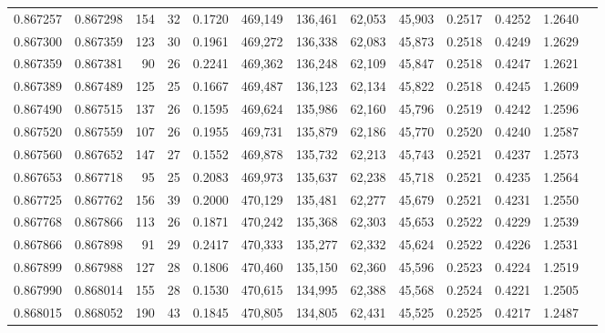 \begin{tabular}{rrrrrrrrrrrrr}
0.867257 & 0.867298 &   154 &  32 &                                     0.1720 & 469,149 & 136,461 &  62,053 &  45,903 & 0.2517 & 0.4252 & 1.2640 \\
0.867300 & 0.867359 &   123 &  30 &                                     0.1961 & 469,272 & 136,338 &  62,083 &  45,873 & 0.2518 & 0.4249 & 1.2629 \\
0.867359 & 0.867381 &    90 &  26 &                                     0.2241 & 469,362 & 136,248 &  62,109 &  45,847 & 0.2518 & 0.4247 & 1.2621 \\
0.867389 & 0.867489 &   125 &  25 &                                     0.1667 & 469,487 & 136,123 &  62,134 &  45,822 & 0.2518 & 0.4245 & 1.2609 \\
0.867490 & 0.867515 &   137 &  26 &                                     0.1595 & 469,624 & 135,986 &  62,160 &  45,796 & 0.2519 & 0.4242 & 1.2596 \\
0.867520 & 0.867559 &   107 &  26 &                                     0.1955 & 469,731 & 135,879 &  62,186 &  45,770 & 0.2520 & 0.4240 & 1.2587 \\
0.867560 & 0.867652 &   147 &  27 &                                     0.1552 & 469,878 & 135,732 &  62,213 &  45,743 & 0.2521 & 0.4237 & 1.2573 \\
0.867653 & 0.867718 &    95 &  25 &                                     0.2083 & 469,973 & 135,637 &  62,238 &  45,718 & 0.2521 & 0.4235 & 1.2564 \\
0.867725 & 0.867762 &   156 &  39 &                                     0.2000 & 470,129 & 135,481 &  62,277 &  45,679 & 0.2521 & 0.4231 & 1.2550 \\
0.867768 & 0.867866 &   113 &  26 &                                     0.1871 & 470,242 & 135,368 &  62,303 &  45,653 & 0.2522 & 0.4229 & 1.2539 \\
0.867866 & 0.867898 &    91 &  29 &                                     0.2417 & 470,333 & 135,277 &  62,332 &  45,624 & 0.2522 & 0.4226 & 1.2531 \\
0.867899 & 0.867988 &   127 &  28 &                                     0.1806 & 470,460 & 135,150 &  62,360 &  45,596 & 0.2523 & 0.4224 & 1.2519 \\
0.867990 & 0.868014 &   155 &  28 &                                     0.1530 & 470,615 & 134,995 &  62,388 &  45,568 & 0.2524 & 0.4221 & 1.2505 \\
0.868015 & 0.868052 &   190 &  43 &                                     0.1845 & 470,805 & 134,805 &  62,431 &  45,525 & 0.2525 & 0.4217 & 1.2487 \\

\end{tabular}
